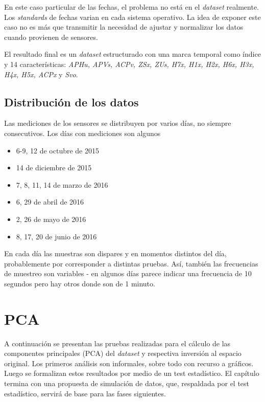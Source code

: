 \documentclass[11pt,spanish,listoffigures,listoftables]{tfgetsinf}
\begin{document}
        En este caso particular de las fechas, el problema no está en el {\em dataset} realmente. Los {\em standards} de fechas varian en cada sistema operativo. La idea de exponer este caso no es más que transmitir la necesidad de ajustar y normalizar los datos cuando provienen de sensores.
        
        El resultado final es un {\em dataset} estructurado con una marca temporal como índice y 14 características: {\em APHu, APVs, ACPv, ZSx, ZUs, H7x, H1x, H2x, H6x, H3x, H4x, H5x, ACPx} y {\em Svo}.
        
        \subsection{Distribución de los datos}
        
        Las mediciones de los sensores se distribuyen por varios días, no siempre consecutivos. Los días con mediciones son algunos 
        \begin{itemize}
        \item 6-9, 12 de octubre de 2015
        \item 14 de diciembre de 2015
        \item 7, 8, 11, 14 de marzo de 2016
        \item 6, 29 de abril de 2016
        \item 2, 26 de mayo de 2016
        \item 8, 17, 20 de junio de 2016
        \end{itemize}
        
        En cada día las muestras son dispares y en momentos distintos del día, probablemente por corresponder a distintas pruebas. Así, también las frecuencias de muestreo son variables - en algunos días parece indicar una frecuencia de 10 segundos pero hay otros donde son de 1 minuto.
    
    \section{PCA}
    A continuación se presentan las pruebas realizadas para el cálculo de las componentes principales (PCA) del {\em dataset} y respectiva inversión al espacio original. Los primeros análisis son informales, sobre todo con recurso a gráficos. Luego se formalizan estos resultados por medio de un test estadístico. El capítulo termina con una propuesta de simulación de datos, que, respaldada por el test estadístico, servirá de base para las fases siguientes.
    
\end{document}
